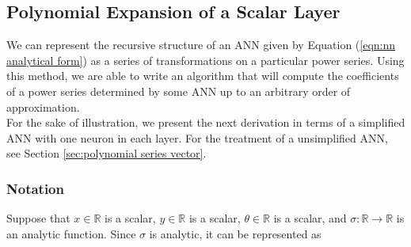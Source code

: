 
\subsection{Polynomial Expansion of a Scalar Layer}
\label{sec:polynomial series scalar}

We can represent the recursive structure of an ANN given by Equation (\ref{eqn:nn analytical form}) as a series of transformations on a particular power series. Using this method, we are able to write an algorithm that will compute the coefficients of a power series determined by some ANN up to an arbitrary order of approximation.\\

For the sake of illustration, we present the next derivation in terms of a simplified ANN with one neuron in each layer. For the treatment of a unsimplified ANN, see Section \ref{sec:polynomial series vector}.

\subsubsection{Notation}
Suppose that $x \in \mathbb{R}$ is a scalar, $y \in \mathbb{R}$ is a scalar, $\theta \in \mathbb{R}$ is a scalar, and $\sigma: \mathbb{R} \to \mathbb{R}$ is an analytic function. Since $\sigma$ is analytic, it can be represented as

